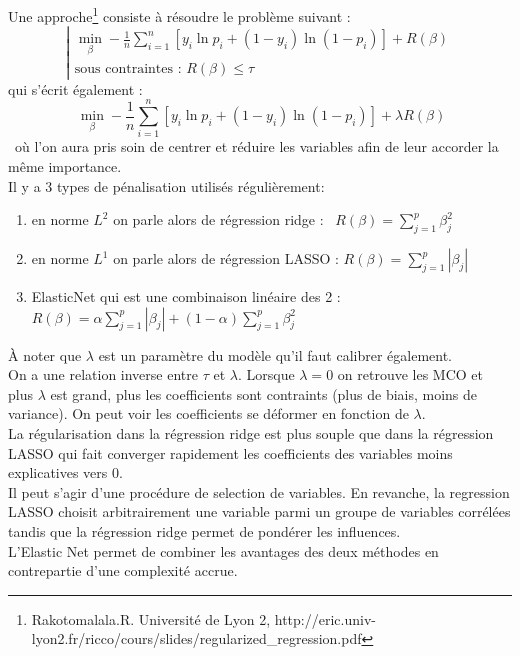 \documentclass[french]{article}
\begin{document}
\begin{multicols}{2}
\noindent Une approche\footnote{\cite{art3} Rakotomalala.R. Université de Lyon 2, http://eric.univ-lyon2.fr/\tild ricco/cours/slides/regularized\_regression.pdf} consiste à résoudre le problème suivant : 
\[ \left| \begin{array}{l}\displaystyle\min_{\beta}-\frac{1}{n} \sum_{i=1}^{n} \left[y_{i} \ln p_{i}+\left(1-y_{i}\right) \ln \left(1-p_{i}\right)\right] + R(\beta) \\
\text{sous contraintes : } R (\beta) \leq \tau \end{array} \right.\]
qui s'écrit également : 
\[\ \displaystyle\min_{\beta}-\frac{1}{n} \sum_{i=1}^{n} \left[y_{i} \ln p_{i}+\left(1-y_{i}\right) \ln \left(1-p_{i}\right)\right] +\lambda R(\beta) \]\
où l'on aura pris soin de centrer et réduire les variables afin de leur accorder la même importance.
\\

\noindent Il y a 3 types de pénalisation utilisés régulièrement: 
\begin{enumerate}
    \item en norme $L^{2}$ on parle alors de régression ridge  : \ $R(\beta)=\sum_{j=1}^{p}\beta_{j}^{2}$
    \item en norme $L^{1}$ on parle alors de régression LASSO  : $R(\beta)=\sum_{j=1}^{p}\left|\beta_{j}\right|$
    \item ElasticNet qui est une combinaison linéaire des 2 : $R(\beta)=\alpha \sum_{j=1}^{p}\left|\beta_{j}\right|+(1-\alpha) \sum_{j=1}^{p} \beta_{j}^{2}$
\end{enumerate}

À noter que $\lambda$ est un paramètre du modèle qu'il faut calibrer également.\\
On a une relation inverse entre $\tau$ et $\lambda$. Lorsque $\lambda=0$ on retrouve les MCO et plus $\lambda$ est grand, plus les coefficients sont contraints (plus de biais, moins de variance).
On peut voir les coefficients se déformer en fonction de $\lambda$.\\
La régularisation dans la régression ridge est plus souple que dans la régression LASSO qui fait converger rapidement les coefficients des variables moins explicatives vers 0.\\ Il peut s'agir d'une procédure de selection de variables.
En revanche, la regression LASSO choisit arbitrairement une variable parmi un groupe de variables corrélées tandis que la régression ridge permet de pondérer les influences.\\
L'Elastic Net permet de combiner les avantages des deux méthodes en contrepartie d'une complexité accrue.\\


\end{multicols}
\end{document}
